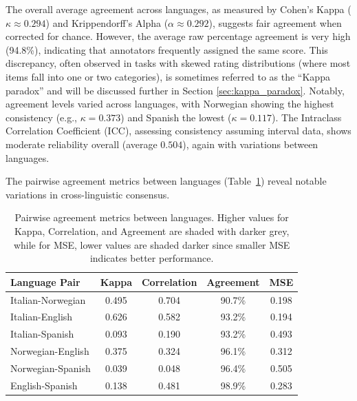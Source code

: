 \documentclass[preprint,12pt,authoryear]{elsarticle}
\begin{document}
The overall average agreement across languages, as measured by Cohen's Kappa ($\kappa \approx 0.294$) and Krippendorff's Alpha ($\alpha \approx 0.292$), suggests fair agreement when corrected for chance. However, the average raw percentage agreement is very high (94.8\%), indicating that annotators frequently assigned the same score. This discrepancy, often observed in tasks with skewed rating distributions (where most items fall into one or two categories), is sometimes referred to as the ``Kappa paradox'' and will be discussed further in Section \ref{sec:kappa_paradox}. Notably, agreement levels varied across languages, with Norwegian showing the highest consistency (e.g., $\kappa = 0.373$) and Spanish the lowest ($\kappa = 0.117$). The Intraclass Correlation Coefficient (ICC), assessing consistency assuming interval data, shows moderate reliability overall (average $0.504$), again with variations between languages.

The pairwise agreement metrics between languages (Table~\ref{tab:pairwise_agreement}) reveal notable variations in cross-linguistic consensus.

\begin{table}[h]
\centering
\caption{Pairwise agreement metrics between languages. Higher values for Kappa, Correlation, and Agreement are shaded with darker grey, while for MSE, lower values are shaded darker since smaller MSE indicates better performance.}
\label{tab:pairwise_agreement}
\begin{tabular}{lcccc}
\toprule
\textbf{Language Pair} & \textbf{Kappa} & \textbf{Correlation} & \textbf{Agreement} & \textbf{MSE} \\
\midrule
Italian-Norwegian & \cellcolor{gray!68} 0.495 & \cellcolor{gray!84} 0.704 & \cellcolor{gray!65} 90.7\% & \cellcolor{gray!74} 0.198 \\
Italian-English   & \cellcolor{gray!86} 0.626 & \cellcolor{gray!70} 0.582 & \cellcolor{gray!75} 93.2\% & \cellcolor{gray!75} 0.194 \\
Italian-Spanish   & \cellcolor{gray!20} 0.093 & \cellcolor{gray!27} 0.190 & \cellcolor{gray!75} 93.2\% & \cellcolor{gray!30} 0.493 \\
Norwegian-English & \cellcolor{gray!52} 0.375 & \cellcolor{gray!40} 0.324 & \cellcolor{gray!88} 96.1\% & \cellcolor{gray!55} 0.312 \\
Norwegian-Spanish & \cellcolor{gray!17} 0.039 & \cellcolor{gray!12} 0.048 & \cellcolor{gray!90} 96.4\% & \cellcolor{gray!27} 0.505 \\
English-Spanish   & \cellcolor{gray!25} 0.138 & \cellcolor{gray!64} 0.481 & \cellcolor{gray!98} 98.9\% & \cellcolor{gray!60} 0.283 \\
\bottomrule
\end{tabular}
\end{table}
\end{document}
